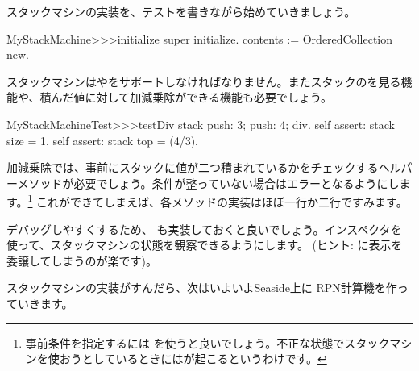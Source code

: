 \documentclass[a4paper,10pt,twoside]{book}
\begin{document}
スタックマシンの実装を、テストを書きながら始めていきましょう。


\begin{code}{}
MyStackMachine>>>initialize
	super initialize.
	contents := OrderedCollection new.
\end{code}

スタックマシンはやをサポートしなければなりません。またスタックのを見る機能や、積んだ値に対して加減乗除ができる機能も必要でしょう。


\begin{code}{}
MyStackMachineTest>>>testDiv
	stack
		push: 3;
		push: 4;
		div.
	self assert: stack size = 1.
	self assert: stack top = (4/3).
\end{code}

加減乗除では、事前にスタックに値が二つ積まれているかをチェックするヘルパーメソッドが必要でしょう。条件が整っていない場合はエラーとなるようにします。\footnote{事前条件を指定するには  を使うと良いでしょう。不正な状態でスタックマシンを使おうとしているときにはが起こるというわけです。}
これができてしまえば、各メソッドの実装はほぼ一行か二行ですみます。

デバッグしやすくするため、 も実装しておくと良いでしょう。インスペクタを使って、スタックマシンの状態を観察できるようにします。
(ヒント:  に表示を委譲してしまうのが楽です)。


スタックマシンの実装がすんだら、次はいよいよSeaside上に RPN計算機を作っていきます。
\end{document}
